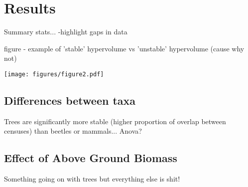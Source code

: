 
\section{Results}


Summary stats... -highlight gaps in data

figure - example of 'stable' hypervolume vs 'unstable' hypervolume (cause why not)

\texttt{[image: figures/figure2.pdf]}

\subsection{Differences between taxa}

Trees are significantly more stable (higher proportion of overlap between censuses) than beetles or mammals...
Anova?

\subsection{Effect of Above Ground Biomass}
Something going on with trees but everything else is shit!